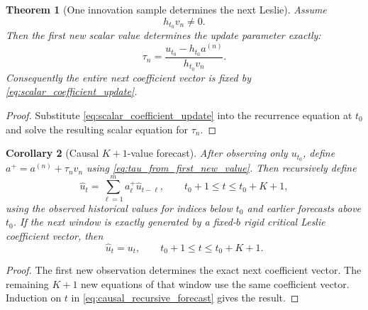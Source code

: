 \documentclass[11pt]{amsart}
\numberwithin{equation}{section}
\theoremstyle{plain}
\newtheorem{theorem}{Theorem}[section]
\newtheorem{corollary}[theorem]{Corollary}
\theoremstyle{definition}
\theoremstyle{remark}
\begin{document}
\begin{theorem}[One innovation sample determines the next Leslie]
\label{thm:one_sample_determines_update}
Assume
\begin{equation}
h_{t_0}v_n\neq0.
\label{eq:innovation_observability}
\end{equation}
Then the first new scalar value determines the update parameter exactly:
\begin{equation}
\boxed{
\tau_n
=
\frac{u_{t_0}-h_{t_0}a^{(n)}}{h_{t_0}v_n}.
}
\label{eq:tau_from_first_new_value}
\end{equation}
Consequently the entire next coefficient vector is fixed by \eqref{eq:scalar_coefficient_update}.
\end{theorem}

\begin{proof}
Substitute \eqref{eq:scalar_coefficient_update} into the recurrence equation at $t_0$ and solve the resulting scalar equation for $\tau_n$.
\end{proof}

\begin{corollary}[Causal $K+1$-value forecast]
\label{cor:causal_Kplus1_forecast}
After observing only $u_{t_0}$, define $a^+=a^{(n)}+\tau_nv_n$ using \eqref{eq:tau_from_first_new_value}.  Then recursively define
\begin{equation}
\widehat u_t
=
\sum_{\ell=1}^{m}a^+_\ell\widehat u_{t-\ell},
\qquad
t_0+1\leq t\leq t_0+K+1,
\label{eq:causal_recursive_forecast}
\end{equation}
using the observed historical values for indices below $t_0$ and earlier forecasts above $t_0$.  If the next window is exactly generated by a fixed-$b$ rigid critical Leslie coefficient vector, then
\begin{equation}
\widehat u_t=u_t,
\qquad
t_0+1\leq t\leq t_0+K+1.
\label{eq:exact_Kplus1_forecast}
\end{equation}
\end{corollary}

\begin{proof}
The first new observation determines the exact next coefficient vector.  The remaining $K+1$ new equations of that window use the same coefficient vector.  Induction on $t$ in \eqref{eq:causal_recursive_forecast} gives the result.
\end{proof}
\end{document}

